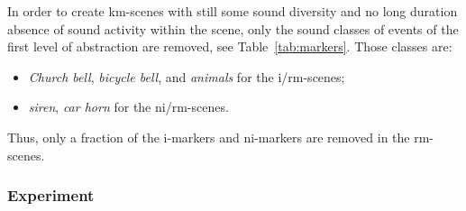\documentclass[twoside,twocolumn]{article}
\begin{document}

In order to create km-scenes with still some sound diversity and no long duration absence of sound activity within the scene, only the sound classes of events of the first level of abstraction are removed, see Table~\ref{tab:markers}. Those classes are:


\begin{itemize}
\item \emph{Church bell}, \emph{bicycle bell}, and \emph{animals} for the i/rm-scenes;
\item \emph{siren}, \emph{car horn} for the ni/rm-scenes.
\end{itemize}


Thus, only a fraction of the i-markers and ni-markers are removed in the rm-scenes.

\subsubsection*{Experiment}


\end{document}
